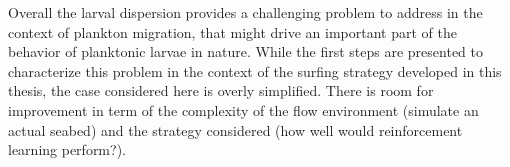 Overall the larval dispersion provides a challenging problem to address in the context of plankton migration, that might drive an important part of the behavior of planktonic larvae in nature.
While the first steps are presented to characterize this problem in the context of the surfing strategy developed in this thesis, the case considered here is overly simplified.
There is room for improvement in term of the complexity of the flow environment (simulate an actual seabed) and the strategy considered (how well would reinforcement learning perform?).
